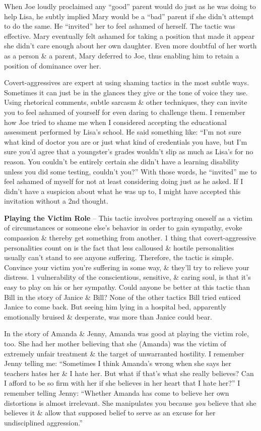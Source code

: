 \documentclass{article}
\numberwithin{equation}{section}
\begin{document}
When Joe loudly proclaimed any ``good'' parent would do just as he was doing to help Lisa, he subtly implied Mary would be a ``bad'' parent if she didn't attempt to do the same. He ``invited'' her to feel ashamed of herself. The tactic was effective. Mary eventually felt ashamed for taking a position that made it appear she didn't care enough about her own daughter. Even more doubtful of her worth as a person \& a parent, Mary deferred to Joe, thus enabling him to retain a position of dominance over her.

Covert-aggressives are expert at using shaming tactics in the most subtle ways. Sometimes it can just be in the glances they give or the tone of voice they use. Using rhetorical comments, subtle sarcasm \& other techniques, they can invite you to feel ashamed of yourself for even daring to challenge them. I remember how Joe tried to shame me when I considered accepting the educational assessment performed by Lisa's school. He said something like: ``I'm not sure what kind of doctor you are or just what kind of credentials you have, but I'm sure you'd agree that a youngster's grades wouldn't slip as much as Lisa's for no reason. You couldn't be entirely certain she didn't have a learning disability unless you did some testing, couldn't you?'' With those words, he ``invited'' me to feel ashamed of myself for not at least considering doing just as he asked. If I didn't have a suspicion about what he was up to, I might have accepted this invitation without a 2nd thought.

\textbf{Playing the Victim Role} -- This tactic involves portraying oneself as a victim of circumstances or someone else's behavior in order to gain sympathy, evoke compassion \& thereby get something from another. 1 thing that covert-aggressive personalities count on is the fact that less calloused \& hostile personalities usually can't stand to see anyone suffering. Therefore, the tactic is simple. Convince your victim you're suffering in some way, \& they'll try to relieve your distress. 1 vulnerability of the conscientious, sensitive, \& caring soul, is that it's easy to play on his or her sympathy. Could anyone be better at this tactic than Bill in the story of Janice \& Bill? None of the other tactics Bill tried enticed Janice to come back. But seeing him lying in a hospital bed, apparently emotionally bruised \& desperate, was more than Janice could bear.

In the story of Amanda \& Jenny, Amanda was good at playing the victim role, too. She had her mother believing that she (Amanda) was the victim of extremely unfair treatment \& the target of unwarranted hostility. I remember Jenny telling me: ``Sometimes I think Amanda's wrong when she says her teachers hates her \& I hate her. But what if that's what she really believes? Can I afford to be so firm with her if she believes in her heart that I hate her?'' I remember telling Jenny: ``Whether Amanda has come to believe her own distortions is almost irrelevant. She manipulates you because \textit{you} believe that she believes it \& allow that supposed belief to serve as an excuse for her undisciplined aggression.''
\end{document}
